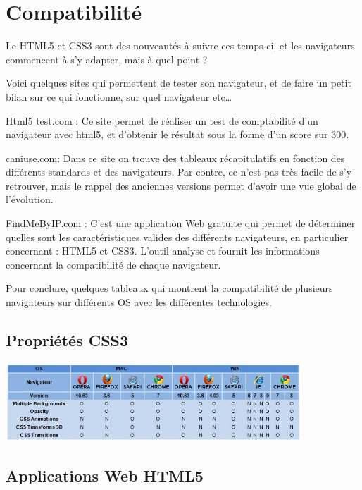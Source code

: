 \documentclass[a4paper,10pt]{report}
\begin{document}
  
  
  \tableofcontents

  \setlength{\parskip}{0.1in}

\chapter{Compatibilité}
Le HTML5 et CSS3 sont des nouveautés à suivre ces temps-ci, et les navigateurs commencent à s’y adapter, mais à quel point ?

Voici quelques sites qui permettent de tester son navigateur, et de faire un petit bilan sur ce qui fonctionne, sur quel navigateur etc…

Html5 test.com : Ce site permet de réaliser un test de comptabilité d’un navigateur avec html5, et d’obtenir le résultat sous la forme d’un score sur 300.

caniuse.com: Dans ce site on trouve des tableaux récapitulatifs en fonction des différents standards et des navigateurs. Par contre, ce n’est pas très facile de s’y retrouver, mais le rappel des anciennes versions permet d’avoir une vue global de l’évolution.

FindMeByIP.com : C’est une application Web gratuite qui permet de déterminer quelles sont les caractéristiques valides des différents navigateurs, en particulier concernant : HTML5 et CSS3. L’outil analyse et fournit les informations concernant la compatibilité de chaque navigateur.

Pour conclure, quelques tableaux qui montrent la compatibilité de plusieurs navigateurs sur différents OS avec les différentes technologies.

\section{Propriétés CSS3}

\includegraphics[width=420px]{img/CSS-Prop.jpg}

\section{Applications Web HTML5}
\end{document}
